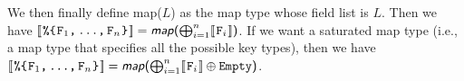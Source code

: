 
We then finally define \textsf{map($L$)} as the map type whose field list is $L$. 
Then we have $\dsb{\map{\texttt{\TSF$_1$,\,...,\,\TSF$_n$}}} =\textsf{\textsl{map}($\bigoplus_{i=1}^{n}\dsb{\TSF_i}$)}$. 
If we want a saturated map type (i.e., a map type that specifies all the possible key types), then we have $\dsb{\map{\texttt{\TSF$_1$,\,...,\,\TSF$_n$}}} =\textsf{\textsl{map}($\bigoplus_{i=1}^{n}\dsb{\TSF_i}\oplus\texttt{Empty}$)}$.
